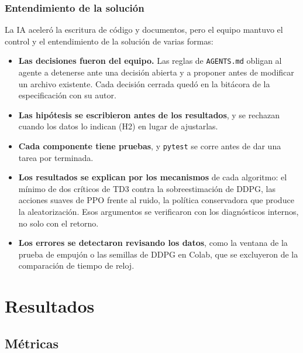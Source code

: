 \documentclass[11pt,a4paper]{article}
\newcommand{\code}[1]{\texttt{#1}}
\begin{document}
\subsubsection{Entendimiento de la solución}

La IA aceleró la escritura de código y documentos, pero el equipo mantuvo el control y el entendimiento de la solución de varias formas:
\begin{itemize}
  \item \textbf{Las decisiones fueron del equipo.} Las reglas de \code{AGENTS.md} obligan al agente a detenerse ante una decisión abierta y a proponer antes de modificar un archivo existente. Cada decisión cerrada quedó en la bitácora de la especificación con su autor.
  \item \textbf{Las hipótesis se escribieron antes de los resultados}, y se rechazan cuando los datos lo indican (H2) en lugar de ajustarlas.
  \item \textbf{Cada componente tiene pruebas}, y \code{pytest} se corre antes de dar una tarea por terminada.
  \item \textbf{Los resultados se explican por los mecanismos} de cada algoritmo: el mínimo de dos críticos de TD3 contra la sobreestimación de DDPG, las acciones suaves de PPO frente al ruido, la política conservadora que produce la aleatorización. Esos argumentos se verificaron con los diagnósticos internos, no solo con el retorno.
  \item \textbf{Los errores se detectaron revisando los datos}, como la ventana de la prueba de empujón o las semillas de DDPG en Colab, que se excluyeron de la comparación de tiempo de reloj.
\end{itemize}

\section{Resultados}

\subsection{Métricas}
\end{document}

